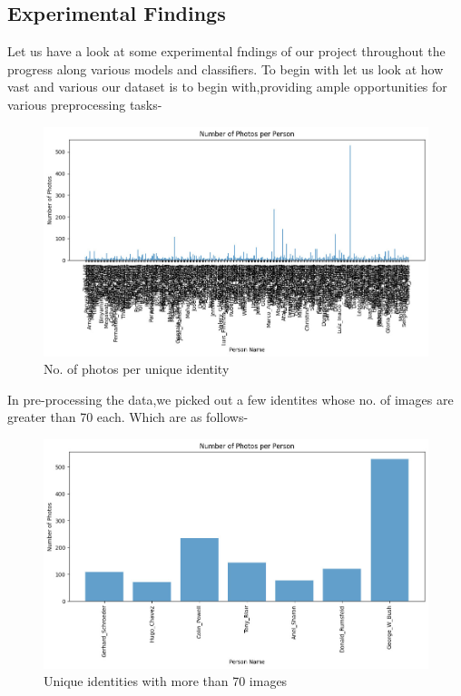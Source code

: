 \documentclass[a4paper]{article}
\theoremstyle{plain}
\theoremstyle{definition}
\begin{document}
\subsection{Experimental Findings	}
\newline
\vspace{10pt}
Let us have a look at some experimental fndings of our project throughout the progress along various models and classifiers.
\newline
To begin with let us look at how vast and various our dataset is to begin with,providing ample opportunities for various preprocessing tasks-
\begin{figure}[H]
    \centering
    \includegraphics[width=0.75\linewidth]{WhatsApp Image 2024-04-21 at 14.23.53_a72961c7.jpg}
    \caption{No. of photos per unique identity}
    \label{fig:enter-label}
\end{figure}

\vspace{20pt}

In pre-processing the data,we picked out a few identites whose no. of images are greater than 70 each. Which are as follows-
\begin{figure}[H]
    \centering
    \includegraphics[width=1\linewidth]{WhatsApp Image 2024-04-21 at 14.23.53_b7e0dd4a.jpg}
    \caption{Unique identities with more than 70 images}
    \label{fig:enter-label}
\end{figure}
\end{document}
